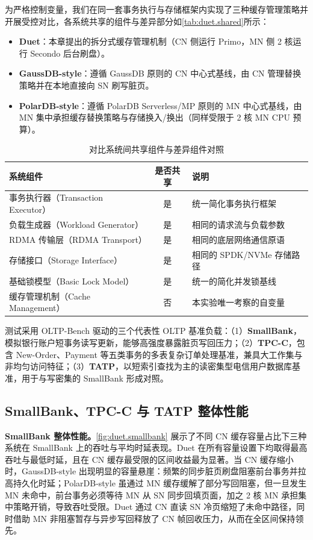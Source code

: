 为严格控制变量，我们在同一套事务执行与存储框架内实现了三种缓存管理策略并开展受控对比，各系统共享的组件与差异部分如\autoref{tab:duet.shared}所示：
\begin{itemize}
    \item \textbf{Duet}：本章提出的拆分式缓存管理机制（CN 侧运行 Primo，MN 侧 2 核运行 Secondo 后台刷盘）。
    \item \textbf{GaussDB-style}：遵循 GaussDB 原则的 CN 中心式基线\cite{liGaussdb2024}，由 CN 管理替换策略并在本地直接向 SN 刷写脏页。
    \item \textbf{PolarDB-style}：遵循 PolarDB Serverless/MP 原则的 MN 中心式基线\cite{caoPolardb2021,yangPolardb2024}，由 MN 集中承担缓存替换策略与存储换入/换出（同样受限于 2 核 MN CPU 预算）。
\end{itemize}

\begin{table}[htbp]
    \centering
    \caption{对比系统间共享组件与差异组件对照\label{tab:duet.shared}}
    \begin{tabularx}{0.85\textwidth}{l c X}
        \toprule
        \textbf{系统组件} & \textbf{是否共享} & \textbf{说明} \\
        \midrule
        事务执行器（Transaction Executor） & 是 & 统一简化事务执行框架 \\
        负载生成器（Workload Generator） & 是 & 相同的请求流与负载参数 \\
        RDMA 传输层（RDMA Transport） & 是 & 相同的底层网络通信原语 \\
        存储接口（Storage Interface） & 是 & 相同的 SPDK/NVMe 存储路径 \\
        基础锁模型（Basic Lock Model） & 是 & 统一的简化并发锁基线 \\
        缓存管理机制（Cache Management） & 否 & 本实验唯一考察的自变量 \\
        \bottomrule
    \end{tabularx}
\end{table}

测试采用 OLTP-Bench 驱动的三个代表性 OLTP 基准负载\cite{difallahOltp2013}：（1）\textbf{SmallBank}，模拟银行账户短事务读写更新，能够高强度暴露脏页写回压力；（2）\textbf{TPC-C}\cite{tpcTpcc1992}，包含 New-Order、Payment 等五类事务的多表复杂订单处理基准，兼具大工作集与非均匀访问特征；（3）\textbf{TATP}\cite{ibmTatp2009}，以短索引查找为主的读密集型电信用户数据库基准，用于与写密集的 SmallBank 形成对照。

\subsection{SmallBank、TPC-C 与 TATP 整体性能}
\textbf{SmallBank 整体性能。}\autoref{fig:duet.smallbank} 展示了不同 CN 缓存容量占比下三种系统在 SmallBank 上的吞吐与平均时延表现。Duet 在所有容量设置下均取得最高吞吐与最低时延，且在 CN 缓存最受限的区间收益最为显著。当 CN 缓存缩小时，GaussDB-style 出现明显的容量悬崖：频繁的同步脏页刷盘阻塞前台事务并拉高持久化时延；PolarDB-style 虽通过 MN 缓存缓解了部分写回阻塞，但一旦发生 MN 未命中，前台事务必须等待 MN 从 SN 同步回填页面，加之 2 核 MN 承担集中策略开销，导致吞吐受限。Duet 通过 CN 直读 SN 冷页缩短了未命中路径，同时借助 MN 非阻塞暂存与异步写回释放了 CN 帧回收压力，从而在全区间保持领先。

